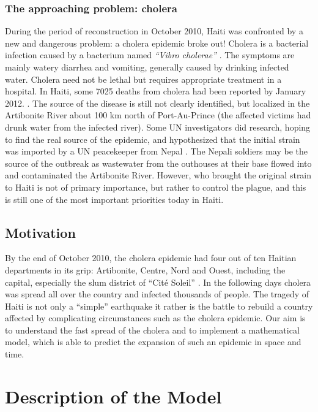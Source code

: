\documentclass[11pt]{article}
\begin{document}
\subsubsection*{The approaching problem: cholera}
During the period of reconstruction in October 2010, Haiti was confronted by a new and dangerous problem: a cholera epidemic broke out! Cholera is a bacterial infection caused by a bacterium named \textit{“Vibro cholerae”} \citep{pacini:1959}. The symptoms are mainly watery diarrhea and vomiting, generally caused by drinking infected water. Cholera need not be lethal but requires appropriate treatment in a hospital. In Haiti, some 7025 deaths from cholera had been reported by January 2012. \cite{web:MSPP}.
The source of the disease is still not clearly identified, but localized in the Artibonite River about 100 km north of Port-Au-Prince (the affected victims had drunk water from the infected river). Some UN investigators did research, hoping to find the real source of the epidemic, and hypothesized that the initial strain was imported by a UN peacekeeper from Nepal \cite{web:alj}. The Nepali soldiers may be the source of the outbreak as wastewater from the outhouses at their base flowed into and contaminated the Artibonite River. However, who brought the original strain to Haiti is not of primary importance, but rather to control the plague, and this is still one of the most important priorities today in Haiti.

\subsection{Motivation}
By the end of October 2010, the cholera epidemic had four out of ten Haitian departments in its grip: Artibonite, Centre, Nord and Ouest, including the capital, especially the slum district of “Cit\'{e} Soleil” \cite{web:alj2}. In the following days cholera was spread all over the country and infected thousands of people. The tragedy of Haiti is not only a “simple” earthquake it rather is the battle to rebuild a country affected by complicating circumstances such as the cholera epidemic. Our aim is to understand the fast spread of the cholera and to implement a mathematical model, which is able to predict the expansion of such an epidemic in space and time.












\newpage
\section{Description of the Model}
\end{document}
